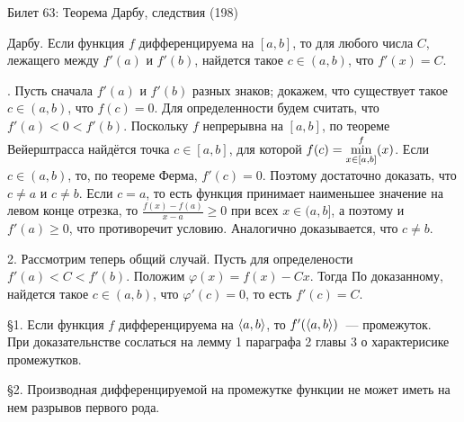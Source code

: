 Билет 63: Теорема Дарбу, следствия
(198)

\T \q Дарбу. Если функция $f$ дифференцируема на $[a, b]$, то для любого числа $C$, лежащего между $f'(a)$ и $f'(b)$, найдется такое $c \in (a, b)$, что $f'(x) = C$.

. Пусть сначала $f'(a)$ и $f'(b)$ разных знаков; докажем, что существует такое $c \in (a, b)$, что $f(c) = 0$. Для определенности будем считать, что $f'(a) < 0 < f'(b)$. Поскольку $f$ непрерывна на $[a, b]$, по теореме Вейерштрасса найдётся точка $c \in [a, b]$, для которой $f(c) =\dsl\min{x\in[a, b]} f(x)$. Если $c\in (a, b)$, то, по теореме Ферма, $f'(c) = 0$. Поэтому достаточно доказать, что $c \neq a$ и $c \neq b$. Если $c = a$, то есть функция принимает наименьшее значение на левом конце отрезка, то $\frac{f(x) - f(a)}{x - a} \ge 0$ при всех $x \in (a, b]$, а поэтому и $f'(a) \ge 0$, что противоречит условию. Аналогично доказывается, что $c\neq b$.

2. Рассмотрим теперь общий случай. Пусть для определености $f'(a) < C < f'(b)$. Положим $\varphi(x) = f(x) - Cx$. Тогда  По доказанному, найдется такое $c \in (a, b)$, что $\varphi'(c) = 0$, то есть $f'(c) = C$.

\S1. Если функция $f$ дифференцируема на $\ang ab$, то $f'(\ang ab)$~--- промежуток.\\
При доказательнстве сослаться на лемму 1 параграфа 2 главы 3 о характерисике промежутков.

\S2. Производная дифференцируемой на промежутке функции не может иметь на нем разрывов первого рода.